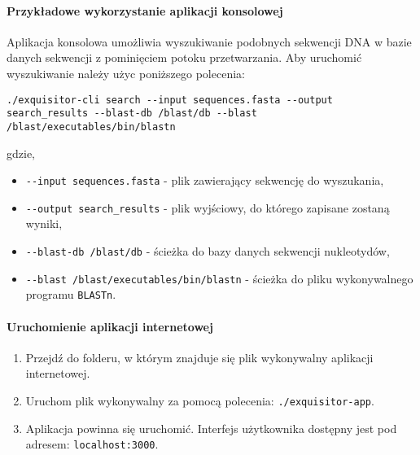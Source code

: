             \paragraph{Przykładowe wykorzystanie aplikacji konsolowej}

                Aplikacja konsolowa umożliwia wyszukiwanie podobnych sekwencji DNA w bazie danych sekwencji z pominięciem potoku przetwarzania. Aby uruchomić wyszukiwanie należy użyc poniższego polecenia:
                
                \texttt{./exquisitor-cli search -\phantom{}-input sequences.fasta -\phantom{}-output search\_results -\phantom{}-blast-db /blast/db -\phantom{}-blast /blast/executables/bin/blastn}

                gdzie,
                \begin{itemize}
                    \item {
                        \texttt{-\phantom{}-input sequences.fasta} - plik zawierający sekwencję do wyszukania,
                    }
                    \item {
                        \texttt{-\phantom{}-output search_results} - plik wyjściowy, do którego zapisane zostaną wyniki,
                    }\item {
                        \texttt{-\phantom{}-blast-db /blast/db} - ścieżka do bazy danych sekwencji nukleotydów,
                    }
                    \item {
                        \texttt{-\phantom{}-blast /blast/executables/bin/blastn} - ścieżka do pliku wykonywalnego programu \texttt{BLASTn}.
                    }
                \end{itemize}

            \paragraph{Uruchomienie aplikacji internetowej}

                \begin{enumerate}
                    \item {
                        Przejdź do folderu, w którym znajduje się plik wykonywalny aplikacji internetowej.
                    }
                    \item {
                        Uruchom plik wykonywalny za pomocą polecenia: \texttt{./exquisitor-app}.
                    }
                    \item {
                        Aplikacja powinna się uruchomić. Interfejs użytkownika dostępny jest pod adresem: 
                        \texttt{localhost:3000}.
                    }
                \end{enumerate}

